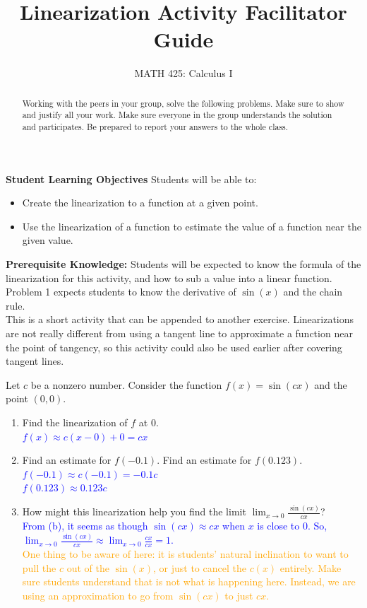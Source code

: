 \documentclass{ximera}
\title{Linearization Activity Facilitator Guide}
\author{MATH 425: Calculus I}
\begin{document}
\begin{abstract}
   Working with the peers in your group, solve the following problems. Make sure to show and justify all your work. Make sure everyone in the group understands the solution and participates. Be prepared to report your answers to the whole class. 
\end{abstract}
\maketitle

\textbf{Student Learning Objectives}
Students will be able to:
    \begin{itemize}
        \item Create the linearization to a function at a given point.
        \item Use the linearization of a function to estimate the value of a function near the given value.  
    \end{itemize}

\textbf{Prerequisite Knowledge:} Students will be expected to know the formula of the linearization for this activity, and how to sub a value into a linear function. Problem 1 expects students to know the derivative of $\sin(x)$ and the chain rule.\\

This is a short activity that can be appended to another exercise. Linearizations are not really different from using a tangent line to approximate a function near the point of tangency, so this activity could also be used earlier after covering tangent lines.  

\begin{exercise}
   Let $c$ be a nonzero number. Consider the function $f(x)=\sin(cx)$ and the point $(0,0)$. \begin{enumerate}
      \item Find the linearization of $f$ at $0$.\\
        \textcolor{blue}{ $f(x)\approx c(x-0)+0=cx$}
        
        \item Find an estimate for $f(-0.1)$. Find an estimate for $f(0.123)$.\\
        \textcolor{blue}{ $f(-0.1)\approx c(-0.1)=-0.1c$\\
        $f(0.123)\approx 0.123c$}
        
        \item How might this linearization help you find the limit $\lim_{x\to 0}\frac{\sin(cx)}{cx}$?\\
        \textcolor{blue}{From (b), it seems as though $\sin(cx)\approx cx$ when $x$ is close to $0$. So, $\lim_{x\to 0}\frac{\sin(cx)}{cx}\approx \lim_{x\to 0}\frac{cx}{cx}=1$.}\\
        \textcolor{orange}{One thing to be aware of here: it is students' natural inclination to want to pull the $c$ out of the $\sin(x)$, or just to cancel the $c(x)$ entirely.  Make sure students understand that is not what is happening here.  Instead, we are using an approximation to go from $\sin(cx)$ to just $cx$.  }
   \end{enumerate}
\end{exercise}
 
\end{document}
